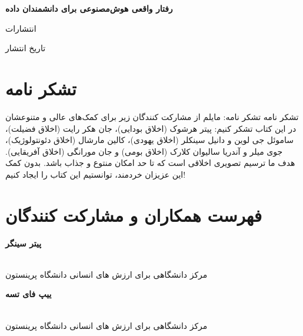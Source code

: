 \documentclass[12pt,oneside]{book}
\begin{document}
    \frontmatter

    \begin{titlepage}
        \begin{center}
            \vspace*{1cm}

            {\huge \textbf{رفتار واقعی هوش‌مصنوعی برای دانشمندان داده}}

            \vspace{0.5cm}
            \LARGE




            \LARGE انتشارات

            \large تاریخ انتشار

        \end{center}
    \end{titlepage}

    \tableofcontents

    \mainmatter


    \section{تشکر نامه}
    تشکر نامه
    تشکر نامه: مایلم از مشارکت کنندگان زیر برای کمک‌های عالی و متنوعشان در این کتاب تشکر کنیم: پیتر هرشوک (اخلاق بودایی)، جان هکر رایت (اخلاق فضیلت)، ساموئل جی لوین و دانیل سینکلر (اخلاق یهودی)، کالین مارشال (اخلاق دئونتولوژیک)، جوی میلر و آندریا سالیوان کلارک (اخلاق بومی) و جان مورانگی (اخلاق آفریقایی). هدف ما ترسیم تصویری اخلاقی است که تا حد امکان منتوع و جذاب باشد. بدون کمک این عزیزان خردمند، توانستیم این کتاب را ایجاد کنیم!

    \newpage


    \section{فهرست همکاران و مشارکت کنندگان}
    \twocolumn

    \begin{flushright}
        \begin{Large}
            \textbf{پیتر سینگر}
        \end{Large}
        \\
        مرکز دانشگاهی برای ارزش های انسانی دانشگاه پرینستون
    \end{flushright}

    \begin{flushright}
        \begin{Large}
            \textbf{ییپ فای تسه}
        \end{Large}
        \\
        مرکز دانشگاهی برای ارزش های انسانی دانشگاه پرینستون
    \end{flushright}
\end{document}
